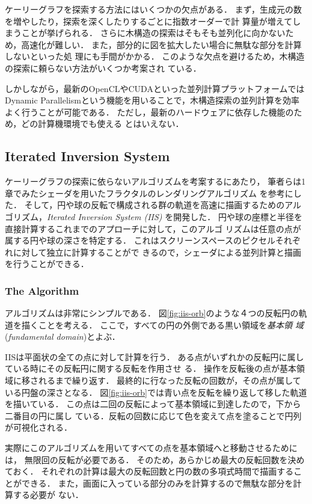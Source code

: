 ケーリーグラフを探索する方法にはいくつかの欠点がある．
まず，生成元の数を増やしたり，探索を深くしたりするごとに指数オーダーで計
算量が増えてしまうことが挙げられる．
さらに木構造の探索はそもそも並列化に向かないため，高速化が難しい．
また，部分的に図を拡大したい場合に無駄な部分を計算しないといった処
理にも手間がかかる．
このような欠点を避けるため，木構造の探索に頼らない方法がいくつか考案され
ている．

しかしながら，最新のOpenCLやCUDAといった並列計算プラットフォームでは
Dynamic Parallelismという機能を用いることで，木構造探索の並列計算を効率
よく行うことが可能である．
ただし，最新のハードウェアに依存した機能のため，どの計算機環境でも使える
とはいえない．

\subsection{Iterated Inversion System}

ケーリーグラフの探索に依らないアルゴリズムを考案するにあたり，
筆者らは1章でみたシェーダを用いたフラクタルのレンダリングアルゴリズム
を参考にした．
そして，円や球の反転で構成される群の軌道を高速に描画するためのアル
ゴリズム，\textit{Iterated Inversion System (IIS)}\cite{bridges2016-367}
を開発した．
円や球の座標と半径を直接計算するこれまでのアプローチに対して，このアルゴ
リズムは任意の点が属する円や球の深さを特定する．
これはスクリーンスペースのピクセルそれぞれに対して独立に計算することがで
きるので，シェーダによる並列計算と描画を行うことができる．

\subsubsection{The Algorithm}

アルゴリズムは非常にシンプルである．
図\ref{fig:iis-orb}のような４つの反転円の軌道を描くことを考える．
ここで，すべての円の外側である黒い領域を\emph{基本領
域}(\textit{fundamental domain})とよぶ．

IISは平面状の全ての点に対して計算を行う．
ある点がいずれかの反転円に属している時にその反転円に関する反転を作用させ
る．
操作を反転後の点が基本領域に移されるまで繰り返す．
最終的に行なった反転の回数が，その点が属している円盤の深さとなる．
図\ref{fig:iis-orb}では青い点を反転を繰り返して移した軌道を描いている．
この点は二回の反転によって基本領域に到達したので，下から二番目の円に属し
ている．反転の回数に応じて色を変えて点を塗ることで円列が可視化される．

実際にこのアルゴリズムを用いてすべての点を基本領域へと移動させるためには，
無限回の反転が必要である． そのため，あらかじめ最大の反転回数を決めておく．
それぞれの計算は最大の反転回数と円の数の多項式時間で描画することができる．
また，画面に入っている部分のみを計算するので無駄な部分を計算する必要が
ない．

